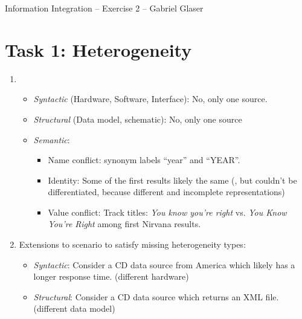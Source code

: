\documentclass{scrartcl}
\begin{document}
	\begin{center}
		\LARGE
		Information Integration -- Exercise 2 -- Gabriel Glaser
	\end{center}
	\vspace{1cm}
	\section*{Task 1: Heterogeneity}
	\begin{enumerate}
		\item 
		\begin{itemize}
			\item \textit{Syntactic} (Hardware, Software, Interface): No, only one source.
			
			\item \textit{Structural} (Data model, schematic): No, only one source
			
			\item \textit{Semantic}:
			\begin{itemize}
				\item Name conflict: synonym labels \enquote{year} and \enquote{YEAR}.
				\item Identity: Some of the first results likely the same (, but couldn't be differentiated, because different and incomplete representations)
				\item Value conflict: Track titles: \textit{You know you're right} vs. \textit{You Know You're Right} among first Nirvana results.
			\end{itemize}
			
		\end{itemize}
	
		\item Extensions to scenario to satisfy missing heterogeneity types:
		\begin{itemize}
			\item \textit{Syntactic}: Consider a CD data source from America which likely has a longer response time. (different hardware)
			
			\item \textit{Structural}: Consider a CD data source which returns an XML file. (different data model)
		\end{itemize}
	\end{enumerate}
	
\end{document}
